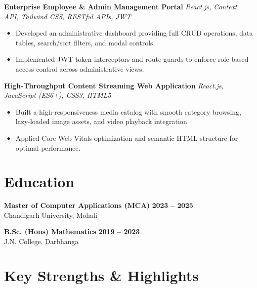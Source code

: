 \documentclass[a4paper,10pt]{article}
\begin{document}
\textbf{Enterprise Employee \& Admin Management Portal}
\hfill
\textit{React.js, Context API, Tailwind CSS, RESTful APIs, JWT}

\begin{itemize}

    \item Developed an administrative dashboard providing full CRUD operations, data tables, search/sort filters, and modal controls.

    \item Implemented JWT token interceptors and route guards to enforce role-based access control across administrative views.

\end{itemize}


\textbf{High-Throughput Content Streaming Web Application}
\hfill
\textit{React.js, JavaScript (ES6+), CSS3, HTML5}

\begin{itemize}

    \item Built a high-responsiveness media catalog with smooth category browsing, lazy-loaded image assets, and video playback integration.

    \item Applied Core Web Vitals optimization and semantic HTML structure for optimal performance.

\end{itemize}

\section*{Education}

\textbf{Master of Computer Applications (MCA)}
\hfill
\textbf{2023 -- 2025}
\\
Chandigarh University, Mohali

\vspace{3pt}

\textbf{B.Sc. (Hons) Mathematics}
\hfill
\textbf{2019 -- 2023}
\\
J.N. College, Darbhanga

\section*{Key Strengths \& Highlights}
\end{document}
